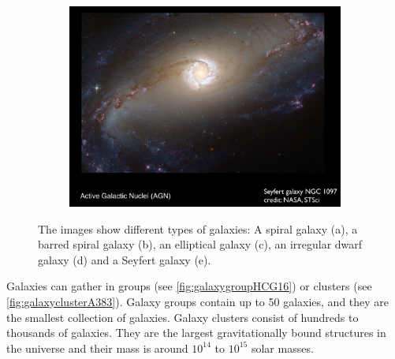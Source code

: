 \begin{figure}
\begin{subfigure}[b]{0.49\textwidth}
			\caption{}
			\label{fig:dwarfirregularNGC1427A}
		\end{subfigure}
		\begin{subfigure}[b]{0.55\textwidth}
			\includegraphics[width=1\linewidth]{img/ch-01/seyfertNGC1097.png}
			\caption{}
			\label{fig:seyfertNGC1097}
		\end{subfigure}
\caption{The images show different types of galaxies: A spiral galaxy (a), a barred spiral galaxy (b), an elliptical galaxy (c), an irregular dwarf galaxy (d) and a Seyfert galaxy (e).}
\end{figure}
Galaxies can gather in groups (see \cref{fig:galaxygroupHCG16}) or clusters (see \cref{fig:galaxyclusterA383}). Galaxy groups contain up to 50 galaxies, and they are the smallest collection of galaxies. Galaxy clusters consist of hundreds to thousands of galaxies. They are the largest gravitationally bound structures in the universe and their mass is around $10^{14}$ to $10^{15}$ solar masses.
